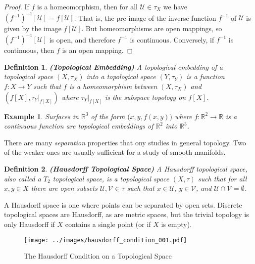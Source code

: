 \documentclass{article}
\theoremstyle{plain}
\theoremstyle{normal}
\newtheorem{definition}{Definition}[section]
\newtheorem{example}{Example}[section]
\begin{document}
        \begin{proof}
            If $f$ is a homeomorphism, then for all $\mathcal{U}\in\tau_{X}$ we
            have $(f^{-1})^{-1}[\mathcal{U}]=f[\mathcal{U}]$. That is, the
            pre-image of the inverse function $f^{-1}$ of $\mathcal{U}$ is given
            by the image $f[\mathcal{U}]$. But homeomorphisms are open mappings,
            so $(f^{-1})^{-1}[\mathcal{U}]$ is open, and therefore $f^{-1}$ is
            continuous. Conversely, if $f^{-1}$ is continuous, then $f$ is an
            open mapping.
        \end{proof}
        \begin{definition}{\textbf{(Topological Embedding)}}
            A topological embedding of a topological space $(X,\tau_{X})$ into a
            topological space $(Y,\tau_{Y})$ is a function $f:X\rightarrow{Y}$
            such that $f$ is a homeomorphism between $(X,\tau_{X})$ and
            $(f[X],\tau_{Y}|_{f[X]})$ where $\tau_{Y}|_{f[X]}$ is the subspace
            topology on $f[X]$.
        \end{definition}
        \begin{example}
            Surfaces in $\mathbb{R}^{3}$ of the form $\big(x,y,f(x,y)\big)$
            where $f:\mathbb{R}^{2}\rightarrow\mathbb{R}$ is a continuous
            function are topological embeddings of $\mathbb{R}^{2}$ into
            $\mathbb{R}^{3}$.
        \end{example}
        There are many \textit{separation} properties that ony studies in
        general topology. Two of the weaker ones are usually sufficient for a
        study of smooth manifolds.
        \begin{definition}{\textbf{(Hausdorff Topological Space)}}
            A Hausdorff topological space, also called a $T_{2}$ topological
            space, is a topological space $(X,\tau)$ such that for all
            $x,y\in{X}$ there are open subsets $\mathcal{U},\mathcal{V}\in\tau$
            such that $x\in\mathcal{U}$, $y\in\mathcal{V}$, and
            $\mathcal{U}\cap\mathcal{V}=\emptyset$.
        \end{definition}
        A Hausdorff space is one where points can be separated by open sets.
        Discrete topological spaces are Hausdorff, as are metric spaces, but
        the trivial topology is only Hausdorff if $X$ contains a single point
        (or if $X$ is empty).
        \begin{figure}
            \centering
            \texttt{[image: ../images/hausdorff\_condition\_001.pdf]}
            \caption{The Hausdorff Condition on a Topological Space}
            \label{fig:hausdorff_condition_001}
        \end{figure}
\end{document}

